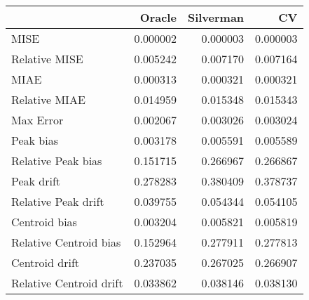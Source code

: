 \begin{tabular}{lrrr}
  \hline
 & Oracle & Silverman & CV \\ 
  \hline
MISE & 0.000002 & 0.000003 & 0.000003 \\ 
  Relative MISE & 0.005242 & 0.007170 & 0.007164 \\ 
  MIAE & 0.000313 & 0.000321 & 0.000321 \\ 
  Relative MIAE & 0.014959 & 0.015348 & 0.015343 \\ 
  Max Error & 0.002067 & 0.003026 & 0.003024 \\ 
  Peak bias & 0.003178 & 0.005591 & 0.005589 \\ 
  Relative Peak bias & 0.151715 & 0.266967 & 0.266867 \\ 
  Peak drift & 0.278283 & 0.380409 & 0.378737 \\ 
  Relative Peak drift & 0.039755 & 0.054344 & 0.054105 \\ 
  Centroid bias & 0.003204 & 0.005821 & 0.005819 \\ 
  Relative Centroid bias & 0.152964 & 0.277911 & 0.277813 \\ 
  Centroid drift & 0.237035 & 0.267025 & 0.266907 \\ 
  Relative Centroid drift & 0.033862 & 0.038146 & 0.038130 \\ 
   \hline
\end{tabular}
